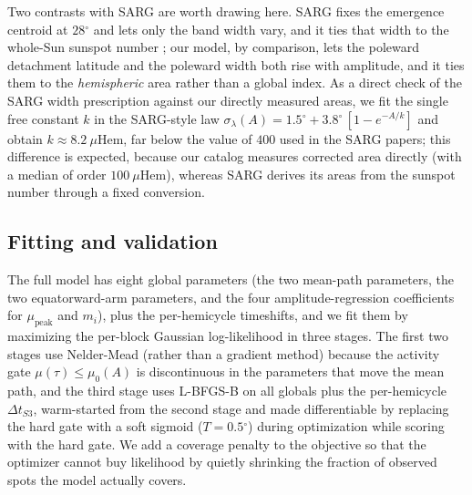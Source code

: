 \documentclass[twocolumn]{aastex631}
\newcommand{\degr}{\ensuremath{^{\circ}}}
\newcommand{\msh}{\ensuremath{\mu\mathrm{Hem}}}   %
\newcommand{\mupeak}{\ensuremath{\mu_{\mathrm{peak}}}}
\newcommand{\muzero}{\ensuremath{\mu_0}}
\begin{document}
Two contrasts with SARG are worth drawing here. SARG fixes the emergence centroid
at $28\degr$ and lets only the band width vary, and it ties that width to the
whole-Sun sunspot number \citep[CIT]{Jha2025}; our model, by comparison, lets the
poleward detachment latitude and the poleward width both rise with amplitude, and
it ties them to the \emph{hemispheric} area rather than a global index. As a
direct check of the SARG width prescription against our directly measured areas,
we fit the single free constant $k$ in the SARG-style law $\sigma_\lambda(A) =
1.5\degr + 3.8\degr\,[1 - e^{-A/k}]$ and obtain $k \approx 8.2~\msh$, far below
the value of $400$ used in the SARG papers; this difference is expected, because
our catalog measures corrected area directly (with a median of order $100~\msh$),
whereas SARG derives its areas from the sunspot number through a fixed
conversion. %

\subsection{Fitting and validation}
\label{sec:fitting}

The full model has eight global parameters (the two mean-path parameters, the
two equatorward-arm parameters, and the four amplitude-regression coefficients
for \mupeak{} and $m_i$), plus the per-hemicycle timeshifts, and we fit them by
maximizing the per-block Gaussian log-likelihood in three stages. The first two
stages use Nelder-Mead (rather than a gradient method) because the activity gate
$\mu(\tau) \leq \muzero(A)$ is discontinuous in the parameters that move the mean
path, and the third stage uses L-BFGS-B on all globals plus the per-hemicycle
$\Delta t_{S3}$, warm-started from the second stage and made differentiable by
replacing the hard gate with a soft sigmoid ($T = 0.5\degr$) during optimization
while scoring with the hard gate. We add a coverage penalty to the objective so
that the optimizer cannot buy likelihood by quietly shrinking the fraction of
observed spots the model actually covers.
\end{document}
